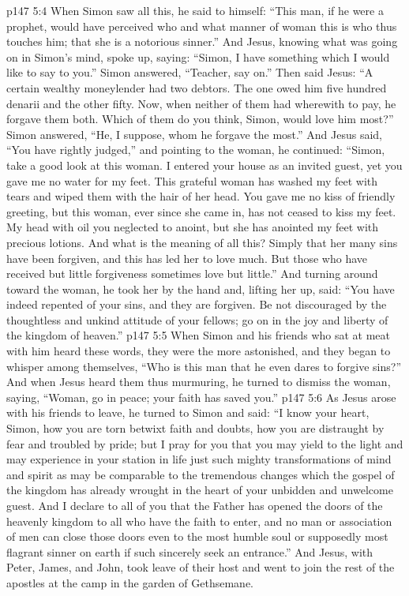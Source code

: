 \vs p147 5:4 When Simon saw all this, he said to himself: “This man, if he were a prophet, would have perceived who and what manner of woman this is who thus touches him; that she is a notorious sinner.” And Jesus, knowing what was going on in Simon’s mind, spoke up, saying: \textcolor{ubdarkred}{“Simon, I have something which I would like to say to you.”} Simon answered, “Teacher, say on.” Then said Jesus: \textcolor{ubdarkred}{“A certain wealthy moneylender had two debtors. The one owed him five hundred denarii and the other fifty. Now, when neither of them had wherewith to pay, he forgave them both. Which of them do you think, Simon, would love him most?”} Simon answered, “He, I suppose, whom he forgave the most.” And Jesus said, \textcolor{ubdarkred}{“You have rightly judged,”} and pointing to the woman, he continued: \textcolor{ubdarkred}{“Simon, take a good look at this woman. I entered your house as an invited guest, yet you gave me no water for my feet. This grateful woman has washed my feet with tears and wiped them with the hair of her head. You gave me no kiss of friendly greeting, but this woman, ever since she came in, has not ceased to kiss my feet. My head with oil you neglected to anoint, but she has anointed my feet with precious lotions. And what is the meaning of all this? Simply that her many sins have been forgiven, and this has led her to love much. But those who have received but little forgiveness sometimes love but little.”} And turning around toward the woman, he took her by the hand and, lifting her up, said: \textcolor{ubdarkred}{“You have indeed repented of your sins, and they are forgiven. Be not discouraged by the thoughtless and unkind attitude of your fellows; go on in the joy and liberty of the kingdom of heaven.”}
\vs p147 5:5 \pc When Simon and his friends who sat at meat with him heard these words, they were the more astonished, and they began to whisper among themselves, “Who is this man that he even dares to forgive sins?” And when Jesus heard them thus murmuring, he turned to dismiss the woman, saying, \textcolor{ubdarkred}{“Woman, go in peace; your faith has saved you.”}
\vs p147 5:6 As Jesus arose with his friends to leave, he turned to Simon and said: \textcolor{ubdarkred}{“I know your heart, Simon, how you are torn betwixt faith and doubts, how you are distraught by fear and troubled by pride; but I pray for you that you may yield to the light and may experience in your station in life just such mighty transformations of mind and spirit as may be comparable to the tremendous changes which the gospel of the kingdom has already wrought in the heart of your unbidden and unwelcome guest. And I declare to all of you that the Father has opened the doors of the heavenly kingdom to all who have the faith to enter, and no man or association of men can close those doors even to the most humble soul or supposedly most flagrant sinner on earth if such sincerely seek an entrance.”} And Jesus, with Peter, James, and John, took leave of their host and went to join the rest of the apostles at the camp in the garden of Gethsemane.
